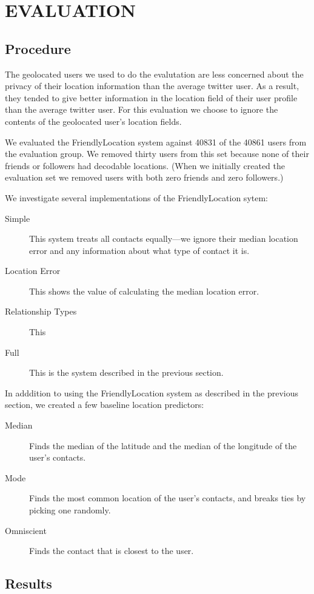 \documentclass{sig-alternate}
\begin{document}
\section{EVALUATION}
\subsection{Procedure}
The geolocated users we used to do the evalutation are less concerned about the
privacy of their location information than the average twitter user.
As a result, they tended to give better information in the location field of
their user profile than the average twitter user.
For this evaluation we choose to ignore the contents of the geolocated user's
location fields.

We evaluated the FriendlyLocation system against 40831 of the 40861 users from the evaluation group.
We removed thirty users from this set because none of their friends or
followers had decodable locations.
(When we initially created the evaluation
set we removed users with both zero friends and zero followers.)

We investigate several implementations of the FriendlyLocation sytem:
\begin{description}
\item[Simple] This system treats all contacts equally---we ignore their median location error and any information about what type of contact it is.
\item[Location Error] This shows the value of calculating the median location error.
\item[Relationship Types] This 
\item[Full] This is the system described in the previous section.
\end{description}

In adddition to using the FriendlyLocation system as described in the previous section, we created a few baseline location predictors:
\begin{description}
\item[Median] Finds the median of the latitude and the median of the longitude of the user's contacts.
\item[Mode] Finds the most common location of the user's contacts, and breaks ties by picking one randomly.
\item[Omniscient] Finds the contact that is closest to the user.
\end{description}

\subsection{Results}
\begin{figure}
\centering
{}
\caption{
}
\label{fig:FinalResults}
\end{figure}
\end{document}
